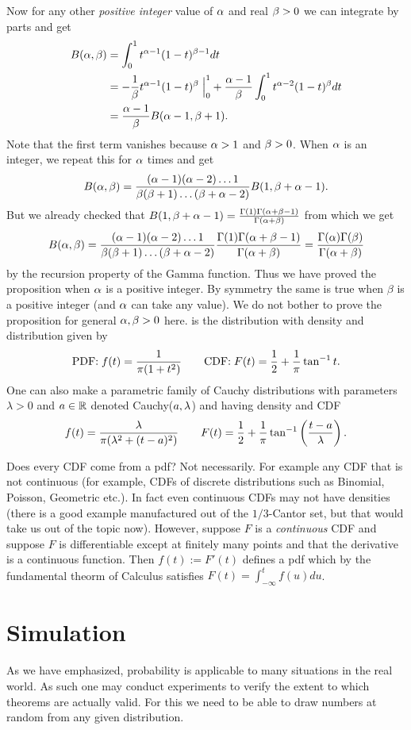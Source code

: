 \documentclass[preprint,  11pt]{amsart}
\begin{document}
Now for any other {\em positive integer} value of $\alpha$ and real $\beta>0$ we can integrate by parts and get
\begin{align*}
B(\alp,\bet)&=\int_{0}^{1}t^{\alp-1}(1-t)^{\bet-1}dt \\
&= -\frac{1}{\bet}t^{\alp-1}(1-t)^{\bet}\given_{0}^{1} + \frac{\alp-1}{\bet}\int_{0}^{1}t^{\alp-2}(1-t)^{\bet}dt \\
&= \frac{\alp-1}{\bet}B(\alp-1,\bet+1).
\end{align*}
Note that the first term vanishes because $\alpha> 1$ and $\beta>0$. When $\alpha$ is an integer, we repeat this for $\alpha$ times and get
$$
B(\alpha,\beta)=\frac{(\alpha-1)(\alpha-2)\ldots 1}{\beta(\beta+1)\ldots (\beta+\alpha-2)}B(1,\beta+\alpha-1).
$$
But we already checked that $B(1,\beta+\alpha-1)=\frac{\Gamma(1)\Gamma(\alpha+\beta-1)}{\Gamma(\alpha+\beta)}$ from which we get
$$
B(\alpha,\beta) = \frac{(\alpha-1)(\alpha-2)\ldots 1}{\beta(\beta+1)\ldots (\beta+\alpha-2)}\frac{\Gamma(1)\Gamma(\alpha+\beta-1)}{\Gamma(\alpha+\beta)} =\frac{\Gamma(\alpha)\Gamma(\beta)}{\Gamma(\alpha+\beta)}
$$
by the recursion property of the Gamma function. Thus we have proved the proposition when $\alpha$ is a positive integer. By symmetry the same is true when $\beta$ is a positive integer (and $\alpha$ can take any value). We do not bother to prove the proposition for general $\alpha,\beta>0$ here.
\eprf
\eeg
\beg {}  is the distribution with density and distribution given by  
$$
\mbox{PDF:}\; f(t) = \frac{1}{\pi(1+t^{2})}\qquad 
\mbox{CDF:}\; F(t) = \frac{1}{2}+\frac{1}{\pi}\tan^{-1}t.
$$
One can also make a parametric family of Cauchy distributions with parameters $\lambda>0$ and $a\in \mathbb{R}$ denoted Cauchy($a,\lambda$) and having density and CDF
$$
f(t)=\frac{\lambda}{\pi(\lambda^{2}+(t-a)^{2})}\qquad F(t)=\frac{1}{2}+\frac{1}{\pi}\tan^{-1}\left(\frac{t-a}{\lambda}\right).
$$
\eeg

\berk Does every CDF come from a pdf? Not necessarily. For example any CDF that is not continuous (for example, CDFs of discrete distributions such as Binomial, Poisson, Geometric etc.). In fact even continuous CDFs may not have densities (there is a good example manufactured out of the $1/3$-Cantor set, but that would take us out of the topic now). However, suppose $F$ is a {\em continuous} CDF and suppose $F$ is differentiable except at finitely many points and that the derivative is a continuous function. Then $f(t):=F'(t)$ defines a pdf which by the fundamental theorm of Calculus satisfies $F(t)=\int_{-\infty}^{t}f(u)du$. 
\eerk

\section{Simulation}
As we have emphasized, probability is applicable to many situations in the real world. As such one may conduct experiments to verify the extent to which theorems are actually valid. For this we need to be able to draw numbers at random from any given distribution. 
\end{document}
